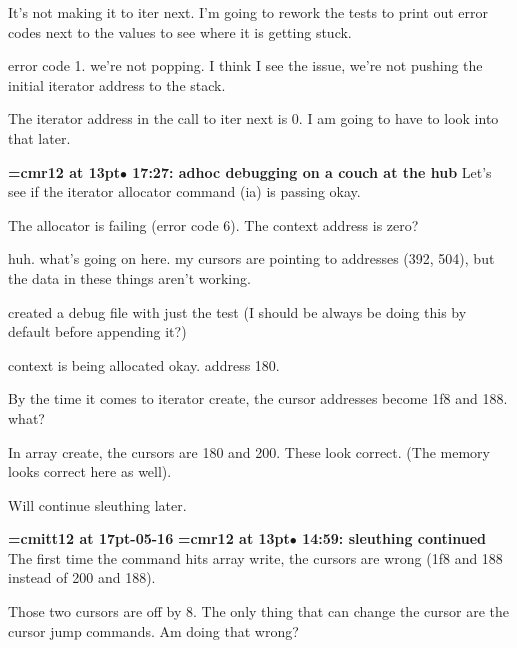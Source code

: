 It's not making it to iter next. I'm going to rework the tests to print out error codes next to the values to see where it is getting stuck.
\par

error code 1. we're not popping. I think I see the issue, we're not pushing the initial iterator address to the stack.
\par

The iterator address in the call to iter next is 0. I am going to have to look into that later.
\par

{\smallskip\noindent\bf\font\titlefont=cmr12 at 13pt\titlefont $\bullet$ 17:27: adhoc debugging on a couch at the hub}\smallskip
Let's see if the iterator allocator command (ia) is passing okay.
\par

The allocator is failing (error code 6). The context address is zero?
\par

huh. what's going on here. my cursors are pointing to addresses (392, 504), but the data in these things aren't working.
\par

created a debug file with just the test (I should be always be doing this by default before appending it?) 
\par

context is being allocated okay. address 180.
\par

By the time it comes to iterator create, the cursor addresses become 1f8 and 188. what?
\par

In array create, the cursors are 180 and 200. These look correct. (The memory looks correct here as well).
\par

Will continue sleuthing later.
\par

{\medskip\noindent\bf\font\titlefont=cmitt12 at 17pt-05-16}\medskip
{\smallskip\noindent\bf\font\titlefont=cmr12 at 13pt\titlefont $\bullet$ 14:59: sleuthing continued}\smallskip
The first time the command hits array write, the cursors are wrong (1f8 and 188 instead of 200 and 188).
\par

Those two cursors are off by 8. The only thing that can change the cursor are the cursor jump commands. Am doing that wrong?
\par

